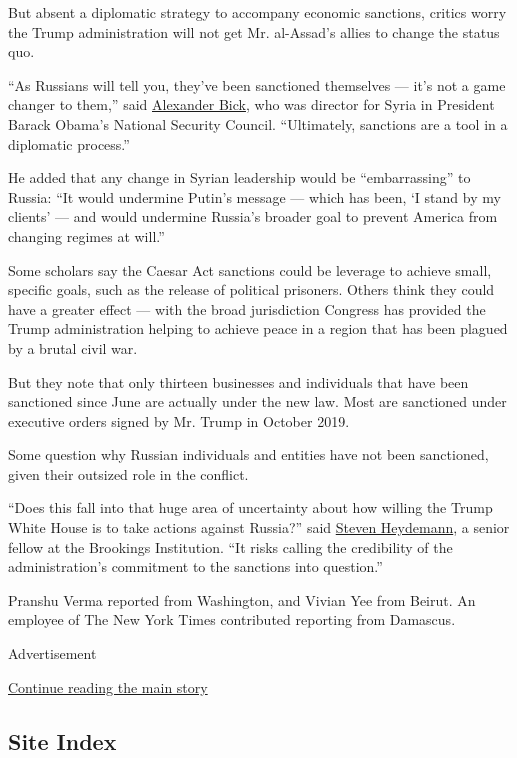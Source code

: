 But absent a diplomatic strategy to accompany economic sanctions,
critics worry the Trump administration will not get Mr. al-Assad's
allies to change the status quo.

``As Russians will tell you, they've been sanctioned themselves --- it's
not a game changer to them,'' said
\href{https://www.wilsoncenter.org/person/alexander-bick}{Alexander
Bick}, who was director for Syria in President Barack Obama's National
Security Council. ``Ultimately, sanctions are a tool in a diplomatic
process.''

He added that any change in Syrian leadership would be ``embarrassing''
to Russia: ``It would undermine Putin's message --- which has been, `I
stand by my clients' --- and would undermine Russia's broader goal to
prevent America from changing regimes at will.''

Some scholars say the Caesar Act sanctions could be leverage to achieve
small, specific goals, such as the release of political prisoners.
Others think they could have a greater effect --- with the broad
jurisdiction Congress has provided the Trump administration helping to
achieve peace in a region that has been plagued by a brutal civil war.

But they note that only thirteen businesses and individuals that have
been sanctioned since June are actually under the new law. Most are
sanctioned under executive orders signed by Mr. Trump in October 2019.

Some question why Russian individuals and entities have not been
sanctioned, given their outsized role in the conflict.

``Does this fall into that huge area of uncertainty about how willing
the Trump White House is to take actions against Russia?'' said
\href{https://www.brookings.edu/experts/steven-heydemann/}{Steven
Heydemann}, a senior fellow at the Brookings Institution. ``It risks
calling the credibility of the administration's commitment to the
sanctions into question.''

Pranshu Verma reported from Washington, and Vivian Yee from Beirut. An
employee of The New York Times contributed reporting from Damascus.

Advertisement

\protect\hyperlink{after-bottom}{Continue reading the main story}

\hypertarget{site-index}{%
\subsection{Site Index}\label{site-index}}

